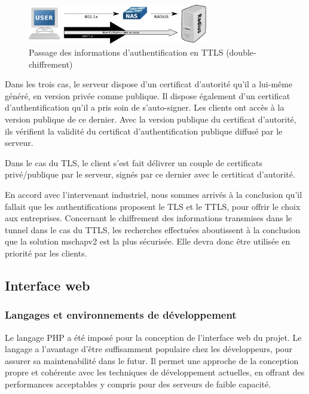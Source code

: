 \begin{figure}[!h]
	\begin{center}
		\includegraphics[width=0.7\textwidth]{img/ttls.pdf}
	\end{center}
	\caption{Passage des informations d'authentification en TTLS (double-chiffrement)}
	\label{ttls}
\end{figure}

Dans les trois cas, le serveur dispose d'un  certificat d'autorité qu'il a lui-même généré, en version privée comme publique. Il dispose également d'un certificat d'authentification qu'il a pris soin de s'auto-signer. Les clients ont accès à la version publique de ce dernier. Avec la version publique du certificat d'autorité, ils vérifient la validité du certificat d'authentification publique diffusé par le serveur.

Dans le cas du TLS, le client s'est fait délivrer un couple de certificats privé/publique par le serveur, signés par ce dernier avec le certiticat d'autorité.

En accord avec l'intervenant industriel, nous sommes arrivés à la conclusion qu'il fallait que les authentifications proposent le TLS et le TTLS, pour offrir le choix aux entreprises. Concernant le chiffrement des informations transmises dans le tunnel dans le cas du TTLS, les recherches effectuées aboutissent à la conclusion que la solution mschapv2 est la plus sécurisée. Elle devra donc être utilisée en priorité par les clients.

\subsection{Interface web}
\subsubsection{Langages et environnements de développement}

Le langage PHP a été imposé pour la conception de l'interface web du projet. Le langage a l'avantage d'être suffisamment populaire chez les développeurs, pour assurer sa maintenabilité dans le futur. Il permet une approche de la conception propre et cohérente avec les techniques de développement actuelles, en offrant des performances acceptables y compris pour des serveurs de faible capacité.

